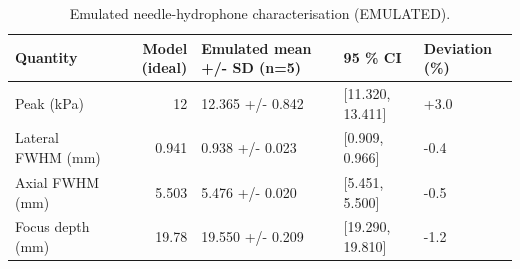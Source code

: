\begin{table}
\caption{Emulated needle-hydrophone characterisation (EMULATED).}
\label{tab:T_E3_hydrophone}
\begin{tabular}{lrlll}
\toprule
Quantity & Model (ideal) & Emulated mean +/- SD (n=5) & 95 \% CI & Deviation (\%) \\
\midrule
Peak (kPa) & 12 & 12.365 +/- 0.842 & [11.320, 13.411] & +3.0 \\
Lateral FWHM (mm) & 0.941 & 0.938 +/- 0.023 & [0.909, 0.966] & -0.4 \\
Axial FWHM (mm) & 5.503 & 5.476 +/- 0.020 & [5.451, 5.500] & -0.5 \\
Focus depth (mm) & 19.78 & 19.550 +/- 0.209 & [19.290, 19.810] & -1.2 \\
\bottomrule
\end{tabular}
\end{table}
